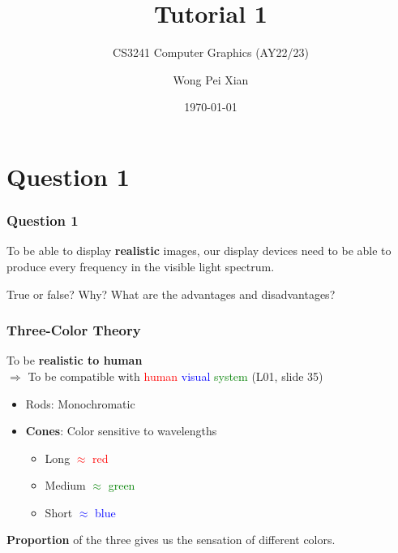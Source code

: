 \documentclass{beamer}
\title{Tutorial 1}
\subtitle{CS3241 Computer Graphics (AY22/23)}
\date{\today}
\author{Wong Pei Xian}
\institute[]{\email{e0389023@u.nus.edu}}
\begin{document}
\frame[plain]{\titlepage}

\section{Question 1}

\begin{frame}
    \frametitle{Question 1}
    To be able to display \textbf{realistic} images, our display devices need to be able to produce 
    every frequency in the visible light spectrum.
    
    \vspace*{1em}
    
    True or false? Why? What are the advantages and disadvantages?
\end{frame}

\begin{frame}
    \frametitle{Three-Color Theory}

    To be \textbf{realistic to human} \\
    $\Rightarrow$ To be compatible with 
    \textcolor{red}{human} \textcolor{blue}{visual} \textcolor{green}{system}
    (L01, slide 35)

    \begin{itemize}
        \item Rods: Monochromatic
        \item \textbf{Cones}: Color sensitive to wavelengths
        \begin{itemize}
            \item Long \textcolor{red}{$\approx$ red}
            \item Medium \textcolor{green}{$\approx$ green}
            \item Short \textcolor{blue}{$\approx$ blue}
        \end{itemize}
    \end{itemize}

    \textbf{Proportion} of the three gives us the sensation of different colors.
\end{frame}
\end{document}
